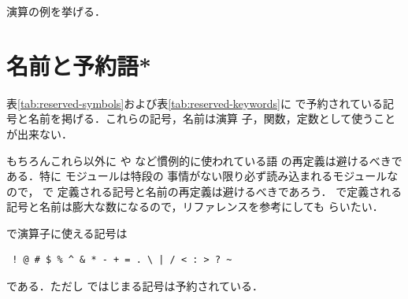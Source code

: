\documentclass[a5paper,twoside,fleqn,draft]{jsbook}
\begin{document}
\begin{leader}
演算の例を挙げる．
\end{leader}


\section{名前と予約語*}

表\ref{tab:reserved-symbols}および表\ref{tab:reserved-keywords}に
\haskell で予約されている記号と名前を掲げる．これらの記号，名前は演算
子，関数，定数として使うことが出来ない．

もちろんこれら以外に \code{+} や  など慣例的に使われている語
の再定義は避けるべきである．特に  モジュールは特段の
事情がない限り必ず読み込まれるモジュールなので， で
定義される記号と名前の再定義は避けるべきであろう．
で定義される記号と名前は膨大な数になるので，リファレンスを参考にしても
らいたい．

\haskell で演算子に使える記号は
\begin{verbatim}
 ! @ # $ % ^ & * - + = . \ | / < : > ? ~
\end{verbatim}%
である．ただし \code{:} ではじまる記号は予約されている．

\end{document}
